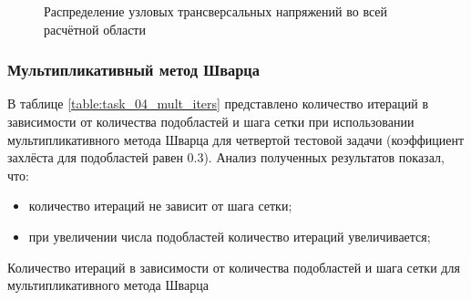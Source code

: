 \documentclass[a4paper]{article}
\begin{document}
\newpage

\begin{figure}[h]
\caption{Распределение узловых трансверсальных напряжений во всей расчётной области}
\label{fig:task_04_basic_pressure_distribution_phi}
\end{figure}

\newpage

\subsubsection{Мультипликативный метод Шварца}

В таблице \ref{table:task_04_mult_iters} представлено количество итераций в зависимости от количества подобластей и шага сетки при использовании мультипликативного метода Шварца для четвертой тестовой задачи (коэффициент захлёста для подобластей равен 0.3). Анализ полученных результатов показал, что:
\begin{itemize}
\item количество итераций не зависит от шага сетки;
\item при увеличении числа подобластей количество итераций увеличивается;
\end{itemize}

\begin{table}[h]
\caption{Количество итераций в зависимости от количества подобластей и шага сетки для мультипликативного метода Шварца}
\label{table:task_04_mult_iters}
\end{table}
\end{document}
